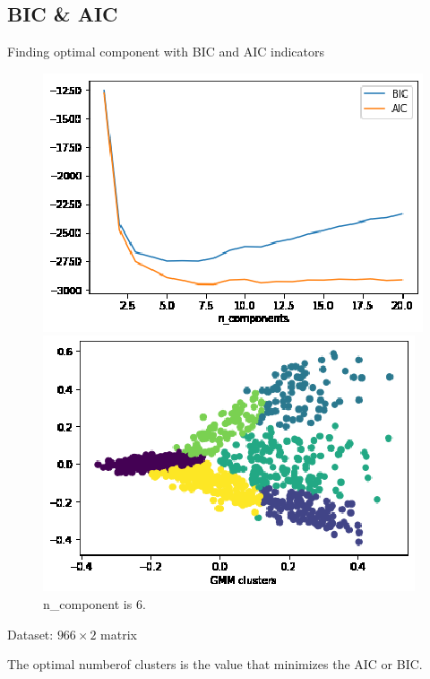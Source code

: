 \documentclass[9pt]{beamer}
\begin{document}
\subsection{BIC &  AIC}
\begin{frame}{Finding optimal component with BIC and AIC indicators}
\begin{figure}[!b]
  \centering
  \begin{minipage}[b]{0.45\textwidth}
    \includegraphics[width=1\columnwidth]{9_gmm_bic.eps}
    \caption{AIC and BIC index.}
  \end{minipage}
  \hfill
  \begin{minipage}[b]{0.45\textwidth}
    \includegraphics[width=1\columnwidth]{9_mm_scatterplot.eps}
    \caption{n\_component is 6.\label{nqa}}
  \end{minipage}
\end{figure}
     \item Dataset: $966\times2$ matrix 
     \item The optimal numberof clusters is the value that minimizes the AIC or BIC.
\end{frame}
\end{document}
